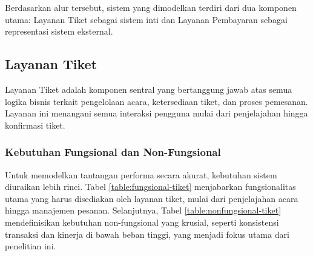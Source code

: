 Berdasarkan alur tersebut, sistem yang dimodelkan terdiri dari dua komponen utama: Layanan Tiket sebagai sistem inti dan Layanan Pembayaran sebagai representasi sistem eksternal.

\subsection{Layanan Tiket}

Layanan Tiket adalah komponen sentral yang bertanggung jawab atas semua logika bisnis terkait pengelolaan acara, ketersediaan tiket, dan proses pemesanan. Layanan ini menangani semua interaksi pengguna mulai dari penjelajahan hingga konfirmasi tiket.

\subsubsection{Kebutuhan Fungsional dan Non-Fungsional}

Untuk memodelkan tantangan performa secara akurat, kebutuhan sistem diuraikan lebih rinci. Tabel \ref{table:fungsional-tiket} menjabarkan fungsionalitas utama yang harus disediakan oleh layanan tiket, mulai dari penjelajahan acara hingga manajemen pesanan. Selanjutnya, Tabel \ref{table:nonfungsional-tiket} mendefinisikan kebutuhan non-fungsional yang krusial, seperti konsistensi transaksi dan kinerja di bawah beban tinggi, yang menjadi fokus utama dari penelitian ini.

\pagebreak

